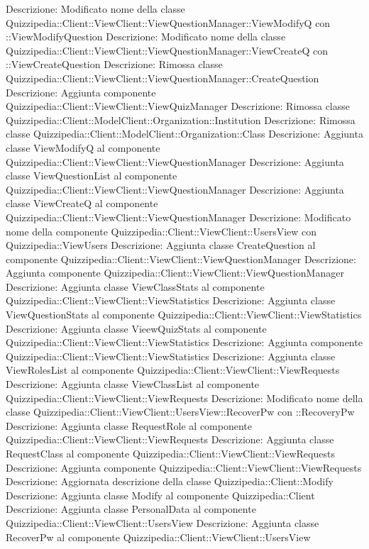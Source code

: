 Descrizione: Modificato nome della classe Quizzipedia::Client::ViewClient::ViewQuestionManager::ViewModifyQ con ::ViewModifyQuestion 
Descrizione: Modificato nome della classe Quizzipedia::Client::ViewClient::ViewQuestionManager::ViewCreateQ con ::ViewCreateQuestion 
Descrizione: Rimossa classe Quizzipedia::Client::ViewClient::ViewQuestionManager::CreateQuestion 
Descrizione: Aggiunta componente Quizzipedia::Client::ViewClient::ViewQuizManager 
Descrizione: Rimossa classe Quizzipedia::Client::ModelClient::Organization::Institution 
Descrizione: Rimossa classe Quizzipedia::Client::ModelClient::Organization::Class 
Descrizione: Aggiunta classe ViewModifyQ al componente Quizzipedia::Client::ViewClient::ViewQuestionManager 
Descrizione: Aggiunta classe ViewQuestionList al componente Quizzipedia::Client::ViewClient::ViewQuestionManager 
Descrizione: Aggiunta classe ViewCreateQ al componente Quizzipedia::Client::ViewClient::ViewQuestionManager 
Descrizione: Modificato nome della componente Quizzipedia::Client::ViewClient::UsersView con Quizzipedia::ViewUsers 
Descrizione: Aggiunta classe CreateQuestion al componente Quizzipedia::Client::ViewClient::ViewQuestionManager 
Descrizione: Aggiunta componente Quizzipedia::Client::ViewClient::ViewQuestionManager 
Descrizione: Aggiunta classe ViewClassStats al componente Quizzipedia::Client::ViewClient::ViewStatistics 
Descrizione: Aggiunta classe ViewQuestionStats al componente Quizzipedia::Client::ViewClient::ViewStatistics 
Descrizione: Aggiunta classe VieewQuizStats al componente Quizzipedia::Client::ViewClient::ViewStatistics 
Descrizione: Aggiunta componente Quizzipedia::Client::ViewClient::ViewStatistics 
Descrizione: Aggiunta classe ViewRolesList al componente Quizzipedia::Client::ViewClient::ViewRequests 
Descrizione: Aggiunta classe ViewClassList al componente Quizzipedia::Client::ViewClient::ViewRequests 
Descrizione: Modificato nome della classe Quizzipedia::Client::ViewClient::UsersView::RecoverPw con ::RecoveryPw 
Descrizione: Aggiunta classe RequestRole al componente Quizzipedia::Client::ViewClient::ViewRequests 
Descrizione: Aggiunta classe RequestClass al componente Quizzipedia::Client::ViewClient::ViewRequests 
Descrizione: Aggiunta componente Quizzipedia::Client::ViewClient::ViewRequests 
Descrizione: Aggiornata descrizione della classe Quizzipedia::Client::Modify 
Descrizione: Aggiunta classe Modify al componente Quizzipedia::Client 
Descrizione: Aggiunta classe PersonalData al componente Quizzipedia::Client::ViewClient::UsersView 
Descrizione: Aggiunta classe RecoverPw al componente Quizzipedia::Client::ViewClient::UsersView 
